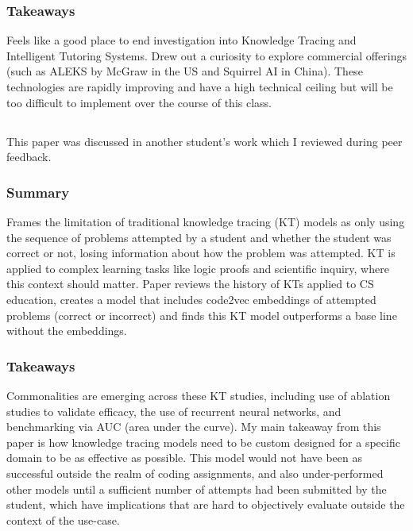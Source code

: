 \documentclass[
	letterpaper, %
]{jdf}
\begin{document}
\subsubsection{Takeaways}
Feels like a good place to end investigation into Knowledge Tracing and Intelligent Tutoring Systems. Drew out a curiosity to explore commercial offerings (such as ALEKS by McGraw in the US and Squirrel AI in China). These technologies are rapidly improving and have a high technical ceiling but will be too difficult to implement over the course of this class.

\subsection{}
This paper was discussed in another student's work which I reviewed during peer feedback.

\subsubsection{Summary}
Frames the limitation of traditional knowledge tracing (KT) models as only using the sequence of problems attempted by a student and whether the student was correct or not, losing information about how the problem was attempted. KT is applied to complex learning tasks like logic proofs and scientific inquiry, where this context should matter. Paper reviews the history of KTs applied to CS education, creates a model that includes code2vec embeddings of attempted problems (correct or incorrect) and finds this KT model outperforms a base line without the embeddings.

\subsubsection{Takeaways}
Commonalities are emerging across these KT studies, including use of ablation studies to validate efficacy, the use of recurrent neural networks, and benchmarking via AUC (area under the curve). My main takeaway from this paper is how knowledge tracing models need to be custom designed for a specific domain to be as effective as possible. This model would not have been as successful outside the realm of coding assignments, and also under-performed other models until a sufficient number of attempts had been submitted by the student, which have implications that are hard to objectively evaluate outside the context of the use-case.
\end{document}
